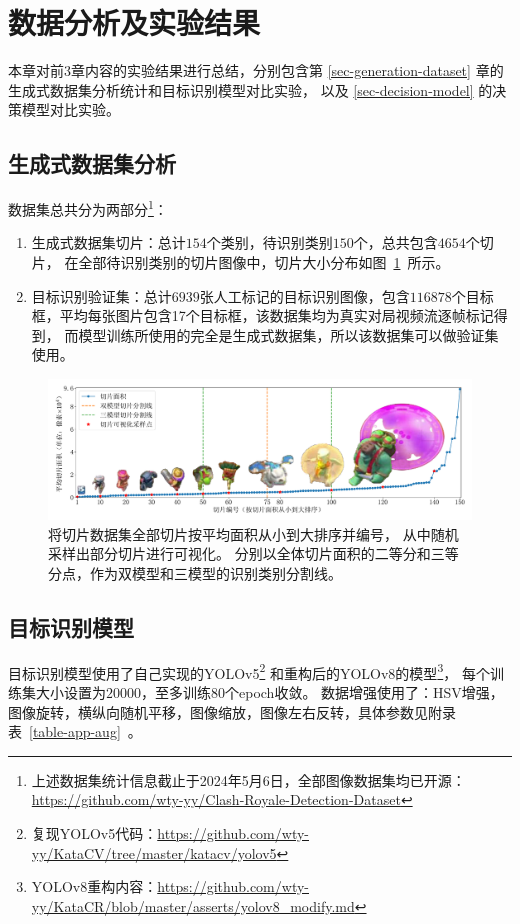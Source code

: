 \documentclass[openany,twoside,nofonts,AutoFakeBold,UTF8]{ctexbook}
\begin{document}
\section{数据分析及实验结果}
本章对前3章内容的实验结果进行总结，分别包含第 \ref{sec-generation-dataset} 章的生成式数据集分析统计和目标识别模型对比实验，
以及 \ref{sec-decision-model} 的决策模型对比实验。

\subsection{生成式数据集分析}{}\label{sec-exp-data}
数据集总共分为两部分\footnote{上述数据集统计信息截止于2024年5月6日，全部图像数据集均已开源：
\url{https://github.com/wty-yy/Clash-Royale-Detection-Dataset}}：
\begin{enumerate}
  \item 生成式数据集切片：总计$154$个类别，待识别类别$150$个，总共包含$4654$个切片，
  在全部待识别类别的切片图像中，切片大小分布如图~\ref{fig-segment}~所示。
  \item 目标识别验证集：总计$6939$张人工标记的目标识别图像，包含$116878$个目标框，平均每张图片包含17个目标框，该数据集均为真实对局视频流逐帧标记得到，
  而模型训练所使用的完全是生成式数据集，所以该数据集可以做验证集使用。
\end{enumerate}

\begin{figure}[htbp]
  \centering
  \includegraphics[width=\textwidth]{segment_size.pdf}
  \caption{将切片数据集全部切片按平均面积从小到大排序并编号，
  从中随机采样出部分切片进行可视化。
  分别以全体切片面积的二等分和三等分点，作为双模型和三模型的识别类别分割线。
  }
  \label{fig-segment}
\end{figure}

\subsection{目标识别模型}{}\label{sec-exp-detect}
目标识别模型使用了自己实现的YOLOv5\footnote{复现YOLOv5代码：\url{https://github.com/wty-yy/KataCV/tree/master/katacv/yolov5}}
和重构后的YOLOv8的模型\footnote{YOLOv8重构内容：\url{https://github.com/wty-yy/KataCR/blob/master/asserts/yolov8_modify.md}}，
每个训练集大小设置为$20000$，至多训练$80$个epoch收敛。
数据增强使用了：HSV增强，图像旋转，横纵向随机平移，图像缩放，图像左右反转，具体参数见附录表~\ref{table-app-aug}~。
\end{document}
